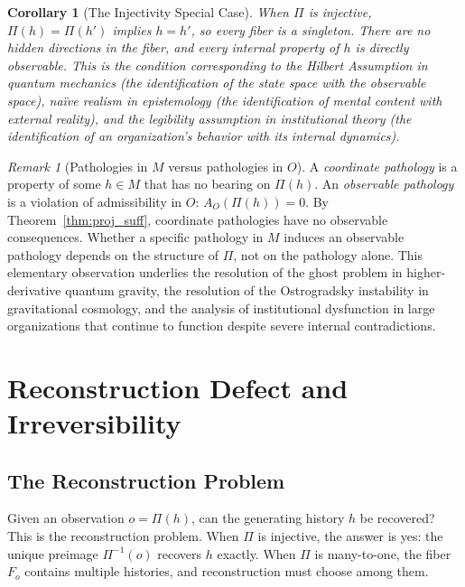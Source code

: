 \documentclass[12pt,a4paper]{article}
\newtheorem{corollary}[theorem]{Corollary}
\theoremstyle{remark}
\newtheorem{remark}{Remark}[section]
\theoremstyle{definition}
\begin{document}
\begin{corollary}[The Injectivity Special Case]
\label{cor:injective}
When $\Pi$ is injective, $\Pi(h) = \Pi(h')$ implies $h = h'$, so every
fiber is a singleton. There are no hidden directions in the fiber, and
every internal property of $h$ is directly observable. This is the
condition corresponding to the Hilbert Assumption in quantum mechanics
(the identification of the state space with the observable space),
naïve realism in epistemology (the identification of mental content with
external reality), and the legibility assumption in institutional theory
(the identification of an organization's behavior with its internal
dynamics).
\end{corollary}

\begin{remark}[Pathologies in $M$ versus pathologies in $O$]
\label{rem:pathologies}
A \emph{coordinate pathology} is a property of some $h \in M$ that has
no bearing on $\Pi(h)$. An \emph{observable pathology} is a violation of
admissibility in $O$: $A_O(\Pi(h)) = 0$. By Theorem~\ref{thm:proj_suff},
coordinate pathologies have no observable consequences. Whether a
specific pathology in $M$ induces an observable pathology depends on
the structure of $\Pi$, not on the pathology alone. This elementary
observation underlies the resolution of the ghost problem in higher-derivative
quantum gravity, the resolution of the Ostrogradsky instability in
gravitational cosmology, and the analysis of institutional dysfunction
in large organizations that continue to function despite severe internal
contradictions.
\end{remark}


\section{Reconstruction Defect and Irreversibility}

\subsection{The Reconstruction Problem}

Given an observation $o = \Pi(h)$, can the generating history $h$ be
recovered? This is the reconstruction problem. When $\Pi$ is injective,
the answer is yes: the unique preimage $\Pi^{-1}(o)$ recovers $h$
exactly. When $\Pi$ is many-to-one, the fiber $F_o$ contains multiple
histories, and reconstruction must choose among them.
\end{document}
